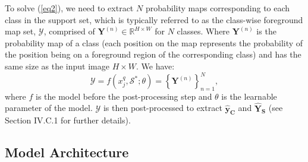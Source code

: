 \documentclass{ieeeaccess}
\begin{document}
To solve (\ref{eq2}), we need to extract $N$ probability maps corresponding to each class in the support set, which is typically referred to as the class-wise foreground map set, $\mathcal{Y}$, comprised of $\mathbf{Y}^{(n)} \in \mathbb{R}^{H \times W}$ for $N$ classes. Where $\mathbf{Y}^{(n)}$ is the probability map of a class (each position on the map represents the probability of the position being on a foreground region of the corresponding class) and has the same size as the input image $H \times W$. We have:
\begin{equation}
\label{eq:probform}
\mathcal{Y}=f(x^q_j, \mathcal{S}^* ; \theta)=\left\{\mathbf{Y}^{(n)}\right\}_{n=1}^{N},
\end{equation}
where $f$ is the model before the post-processing step and $\theta$ is the learnable parameter of the model. $\mathcal{Y}$ is then post-processed to extract $\hat{\mathbf{y}}_{\mathbf{C}}$ and $\hat{\mathbf{Y}}_{\mathbf{S}}$ (see Section IV.C.1 for further details).

\subsection{Model Architecture}
\label{ModelArch}

\end{document}
